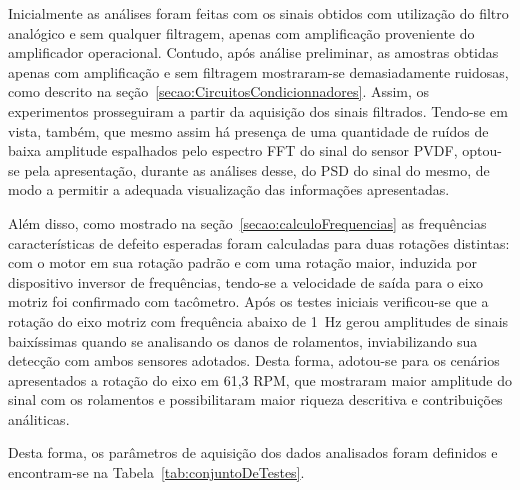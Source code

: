 \documentclass[
	12pt,				
	oneside,			
	a4paper,			
	english,			
	brazil,	
	sumario=abnt-6027-2012		
	]{abntex2ppgsi}
\begin{document}
Inicialmente as análises foram feitas com os sinais obtidos com utilização do filtro analógico e sem qualquer filtragem, apenas com amplificação proveniente do amplificador operacional. Contudo, após análise preliminar, as amostras obtidas apenas com amplificação e sem filtragem mostraram-se demasiadamente ruidosas, como descrito na seção~\ref{secao:CircuitosCondicionnadores}. Assim, os experimentos prosseguiram a partir da aquisição dos sinais filtrados. Tendo-se em vista, também, que mesmo assim há presença de uma quantidade de ruídos de baixa amplitude espalhados pelo espectro FFT do sinal do sensor PVDF, optou-se pela apresentação, durante as análises desse, do PSD do sinal do mesmo, de modo a permitir a adequada visualização das informações apresentadas.

Além disso, como mostrado na seção~\ref{secao:calculoFrequencias} as frequências características de defeito esperadas foram calculadas para duas rotações distintas: com o motor em sua rotação padrão e com uma rotação maior, induzida por dispositivo inversor de frequências, tendo-se a velocidade de saída para o eixo motriz foi confirmado com tacômetro. Após os testes iniciais verificou-se que a rotação do eixo motriz com frequência abaixo de \SI{1}{\hertz} gerou amplitudes de sinais baixíssimas quando se analisando os danos de rolamentos, inviabilizando sua detecção com ambos sensores adotados. Desta forma, adotou-se para os cenários apresentados a rotação do eixo em 61,3 RPM, que mostraram maior amplitude do sinal com os rolamentos e possibilitaram maior riqueza descritiva e contribuições análiticas. 

Desta forma, os parâmetros de aquisição dos dados analisados foram definidos e encontram-se na Tabela~\ref{tab:conjuntoDeTestes}.
\end{document}
